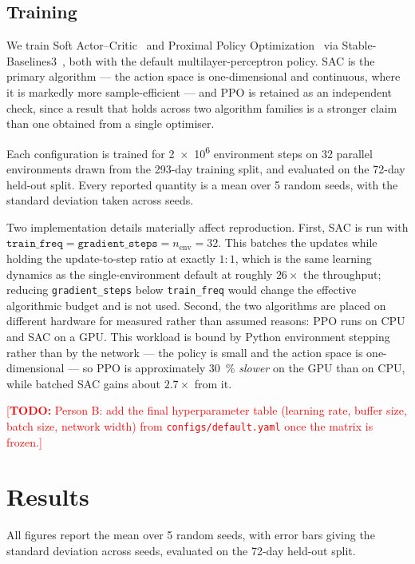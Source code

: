 \documentclass[conference]{IEEEtran}
\newcommand{\TODO}[1]{\textcolor{red}{[\textbf{TODO:} #1]}}
\begin{document}
\subsection{Training}
We train Soft Actor--Critic~\cite{haarnoja2018sac} and Proximal Policy
Optimization~\cite{schulman2017ppo} via Stable-Baselines3~\cite{raffin2021sb3}, both with
the default multilayer-perceptron policy. SAC is the primary algorithm --- the action space
is one-dimensional and continuous, where it is markedly more sample-efficient --- and PPO is
retained as an independent check, since a result that holds across two algorithm families
is a stronger claim than one obtained from a single optimiser.

Each configuration is trained for \num{2e6} environment steps on \num{32} parallel
environments drawn from the \num{293}-day training split, and evaluated on the
\num{72}-day held-out split. Every reported quantity is a mean over \num{5} random seeds,
with the standard deviation taken across seeds.

Two implementation details materially affect reproduction. First, SAC is run with
$\texttt{train\_freq} = \texttt{gradient\_steps} = n_\mathrm{env} = 32$. This batches the
updates while holding the update-to-step ratio at exactly $1{:}1$, which is the same
learning dynamics as the single-environment default at roughly $26\times$ the throughput;
reducing \texttt{gradient\_steps} below \texttt{train\_freq} would change the effective
algorithmic budget and is not used. Second, the two algorithms are placed on different
hardware for measured rather than assumed reasons: PPO runs on CPU and SAC on a GPU. This
workload is bound by Python environment stepping rather than by the network --- the policy
is small and the action space is one-dimensional --- so PPO is approximately
\SI{30}{\percent} \emph{slower} on the GPU than on CPU, while batched SAC gains about
$2.7\times$ from it.

\TODO{Person B: add the final hyperparameter table (learning rate, buffer size, batch
size, network width) from \texttt{configs/default.yaml} once the matrix is frozen.}

\section{Results}\label{sec:results}

All figures report the mean over \num{5} random seeds, with error bars giving the standard
deviation across seeds, evaluated on the \num{72}-day held-out split.
\end{document}
